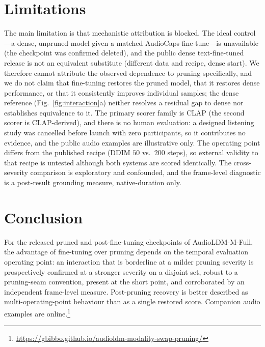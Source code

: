\documentclass[conference]{IEEEtran}
\begin{document}
\section{Limitations}
The main limitation is that mechanistic attribution is blocked. The ideal control---a dense,
unpruned model given a matched AudioCaps fine-tune---is unavailable (the checkpoint was
confirmed deleted), and the public dense text-fine-tuned release is not an equivalent
substitute (different data and recipe, dense start). We therefore cannot attribute the
observed dependence to pruning specifically, and we do not claim that fine-tuning restores
the pruned model, that it restores dense performance, or that it consistently improves
individual samples; the dense reference (Fig.~\ref{fig:interaction}a) neither resolves a
residual gap to dense nor establishes equivalence to it. The primary scorer family is CLAP
(the second scorer is CLAP-derived), and there is no human evaluation: a designed listening
study was cancelled before launch with zero participants, so it contributes no evidence, and
the public audio examples are illustrative only. The operating point differs from the
published recipe (DDIM $50$ vs.\ $200$ steps), so external validity to that recipe is
untested although both systems are scored identically. The cross-severity comparison is
exploratory and confounded, and the frame-level diagnostic is a post-result grounding
measure, native-duration only.

\section{Conclusion}
For the released pruned and post-fine-tuning checkpoints of AudioLDM-M-Full, the advantage of
fine-tuning over pruning depends on the temporal evaluation operating point: an interaction
that is borderline at a milder pruning severity is prospectively confirmed at a stronger
severity on a disjoint set, robust to a pruning-seam convention, present at the short point,
and corroborated by an independent frame-level measure. Post-pruning recovery is better
described as multi-operating-point behaviour than as a single restored score. Companion audio
examples are online.\footnote{\url{https://gbibbo.github.io/audioldm-modality-swap-pruning/}}
\end{document}
